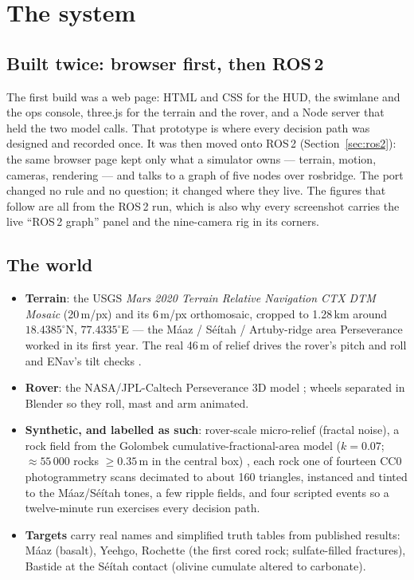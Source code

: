 \documentclass[11pt]{article}
\begin{document}
\section{The system}

\subsection{Built twice: browser first, then ROS\,2}
The first build was a web page: HTML and CSS for the HUD, the swimlane and the ops console, three.js for the terrain and the rover, and a Node server that held the two model calls. That prototype is where every decision path was designed and recorded once. It was then moved onto ROS\,2 (Section~\ref{sec:ros2}): the same browser page kept only what a simulator owns --- terrain, motion, cameras, rendering --- and talks to a graph of five nodes over rosbridge. The port changed no rule and no question; it changed where they live. The figures that follow are all from the ROS\,2 run, which is also why every screenshot carries the live ``ROS\,2 graph'' panel and the nine-camera rig in its corners.

\subsection{The world}
\begin{itemize}
\item \textbf{Terrain}: the USGS \emph{Mars 2020 Terrain Relative Navigation CTX DTM Mosaic} (20\,m/px) and its 6\,m/px orthomosaic, cropped to 1.28\,km around $18.4385^\circ$N, $77.4335^\circ$E --- the M\'aaz / S\'e\'itah / Artuby-ridge area Perseverance worked in its first year. The real 46\,m of relief drives the rover's pitch and roll and ENav's tilt checks \cite{fergason}.
\item \textbf{Rover}: the NASA/JPL-Caltech Perseverance 3D model \cite{nasa3d}; wheels separated in Blender so they roll, mast and arm animated.
\item \textbf{Synthetic, and labelled as such}: rover-scale micro-relief (fractal noise), a rock field from the Golombek cumulative-fractional-area model ($k=0.07$; $\approx 55\,000$ rocks $\ge 0.35$\,m in the central box) \cite{golombek}, each rock one of fourteen CC0 photogrammetry scans \cite{polyhaven} decimated to about 160 triangles, instanced and tinted to the M\'aaz/S\'e\'itah tones, a few ripple fields, and four scripted events so a twelve-minute run exercises every decision path.
\item \textbf{Targets} carry real names and simplified truth tables from published results: M\'aaz (basalt), Yeehgo, Rochette (the first cored rock; sulfate-filled fractures), Bastide at the S\'e\'itah contact (olivine cumulate altered to carbonate).
\end{itemize}
\end{document}
